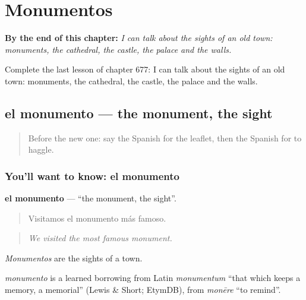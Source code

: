 
\chapter{Monumentos}
\label{ch:es-monumentos}

\begin{chapteropening}
\textbf{By the end of this chapter:} \emph{I can talk about the sights of an old town: monuments, the cathedral, the castle, the palace and the walls.}

Complete the last lesson of chapter 677: I can talk about the sights of an old town: monuments, the cathedral, the castle, the palace and the walls.
\end{chapteropening}

\section[el monumento]{el monumento — the monument, the sight}

\label{lesson:ES-C677-monumento}



\begin{quote}
Before the new one: say the Spanish for the leaflet, then the Spanish for to haggle.
\end{quote}

\subsection*{You'll want to know: el monumento}
\textbf{el monumento} — \textquotedblleft{}the monument, the sight\textquotedblright{}.

\begin{quote}
Visitamos el monumento más famoso.
\end{quote}

\begin{quote}
\emph{We visited the most famous monument.}
\end{quote}

\emph{Monumentos} are the sights of a town.

\begin{cousinweb}
\emph{monumento} is a learned borrowing from Latin \emph{monumentum} \textquotedblleft{}that which keeps a memory, a memorial\textquotedblright{} (Lewis \& Short; EtymDB), from \emph{monēre} \textquotedblleft{}to remind\textquotedblright{}.
\end{cousinweb}

